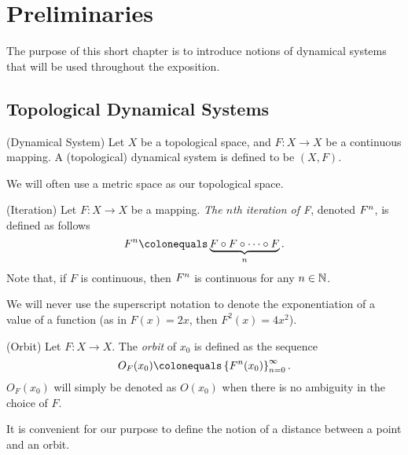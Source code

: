\documentclass[10pt,twoside,draft]{book}
\begin{document}
\chapter{Preliminaries}
\label{chap:prelim}
The purpose of this short chapter is to introduce notions of dynamical systems that will be used throughout the exposition.

\section{Topological Dynamical Systems}
\begin{definition}
  (Dynamical System)
  Let $X$ be a topological space, and $F: X \to X$ be a continuous mapping.
  A (topological) dynamical system is defined to be $(X, F)$.
\end{definition}
\begin{remark}
  We will often use a metric space as our topological space.
\end{remark}
%
\begin{definition}
  (Iteration)
  Let $F: X \to X$ be a mapping.
  \textit{The $n$th iteration of F}, denoted $F^{n}$, is defined as follows
  \begin{equation*}
    \itr{F}{n} \ceq \underbrace{F \circ F \circ \cdots \circ F}_{n} .
  \end{equation*}
  Note that, if $F$ is continuous, then $F^{n}$ is continuous for any $n \in \mathbb{N}$.
\end{definition}
\begin{remark}
  We will never use the superscript notation to denote the exponentiation of a value of a function (as in $F(x) = 2x$, then $F^2(x) = 4x^2$).
\end{remark}
\begin{definition}
  (Orbit)
  Let $F: X \to X$. 
  The \textit{orbit} of $x_0$ is defined as the sequence
  \begin{equation*}
    O_F(x_0) \ceq \seq{\itr{F}{n}(x_0)}{\infty}{n = 0}.
  \end{equation*}
  $O_F(x_0)$ will simply be denoted as $O(x_0)$ when there is no ambiguity in the choice of $F$.
  \label{def:orbit}
\end{definition}
It is convenient for our purpose to define the notion of a distance between a point and an orbit.
\end{document}
